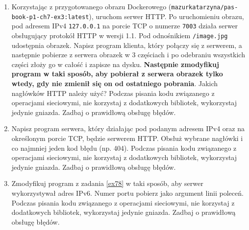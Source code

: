 \documentclass{article}
\begin{document}
\begin{enumerate}[label=\textbf{7.\arabic*}]

\item Korzystając z przygotowanego obrazu Dockerowego (\texttt{mazurkatarzyna/pas-book-p1-ch7-ex3:latest}), uruchom serwer HTTP.  Po uruchomieniu obrazu, pod adresem IPv4 \texttt{127.0.0.1} na porcie TCP o numerze \texttt{7003} działa serwer obsługujący protokół HTTP w wersji 1.1. Pod odnośnikiem \texttt{/image.jpg} udostępnia obrazek. Napisz program klienta, który połączy się
z serwerem, a następnie pobierze z serwera obrazek w 3 częściach i po odebraniu wszystkich części złoży go w całość i zapisze na dysku. \textbf{Następnie zmodyfikuj program   w taki sposób, aby pobierał z serwera obrazek tylko wtedy, gdy nie zmienił się on od ostatniego pobrania}. Jakich nagłówków HTTP należy użyć? Podczas pisania kodu związanego z operacjami sieciowymi, nie korzystaj z dodatkowych bibliotek, wykorzystaj jedynie gniazda. Zadbaj o prawidłową obsługę błędów.


\item \label{ex78} Napisz program serwera, który działając pod podanym adresem IPv4   oraz na określonym porcie TCP, będzie serwerem HTTP. Obsłuż wybrane nagłówki i co najmniej jeden kod błędu (np. 404).  Podczas pisania kodu związanego z operacjami sieciowymi, nie korzystaj z dodatkowych bibliotek, wykorzystaj jedynie gniazda. Zadbaj o prawidłową obsługę błędów.


\item  Zmodyfikuj program z zadania \ref{ex78} w taki sposób, aby serwer wykorzystywał adres IPv6.  Numer portu pobierz jako argument  linii poleceń. Podczas pisania kodu związanego z operacjami sieciowymi, nie korzystaj z dodatkowych bibliotek, wykorzystaj jedynie gniazda. Zadbaj o prawidłową obsługę błędów. 
    


\end{enumerate}

\newpage 

\end{document}

